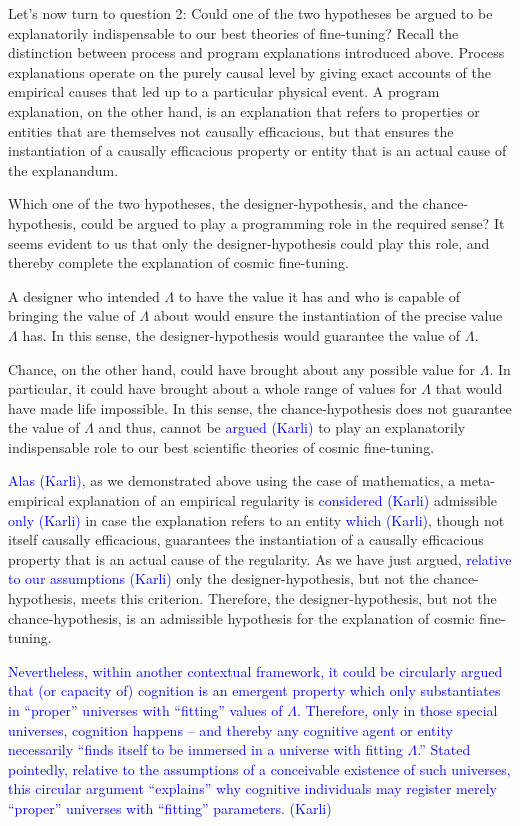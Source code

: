 \documentclass[a4paper,12pt]{article}
\newcommand{\karli}[1]{\textcolor{blue}{#1 (Karli)}}
\begin{document}
Let's now turn to question 2: Could one of the two hypotheses be argued to be explanatorily indispensable to our best theories of fine-tuning? Recall the distinction between process and program explanations introduced above. Process explanations operate on the purely causal level by giving exact accounts of the empirical causes that led up to a particular physical event. A program explanation, on the other hand, is an explanation that refers to properties or entities that are themselves not causally efficacious, but that ensures the instantiation of a causally efficacious property or entity that is an actual cause of the explanandum.

Which one of the two hypotheses, the designer-hypothesis, and the chance-hypothesis, could be argued to play a programming role in the required sense? It seems evident to us that only the designer-hypothesis could play this role, and thereby complete the explanation of cosmic fine-tuning.

A designer who intended $\Lambda$ to have the value it has and who is capable of bringing the value of $\Lambda$ about would ensure the instantiation of the precise value $\Lambda$ has. In this sense, the designer-hypothesis would guarantee the value of $\Lambda$.

Chance, on the other hand, could have brought about any possible value for $\Lambda$.
In particular, it could have brought about a whole range of values for $\Lambda$ that would have made life impossible.
In this sense, the chance-hypothesis does not guarantee the value of $\Lambda$ and thus, cannot be \karli{argued}
to play an explanatorily indispensable role to our best scientific theories of cosmic fine-tuning.

\karli{Alas}, as we demonstrated above using the case of mathematics,
a meta-empirical explanation of an empirical regularity is \karli{considered}
admissible \karli{only}
in case the explanation refers to an entity \karli{which},
though not itself causally efficacious, guarantees the instantiation of a causally efficacious property
that is an actual cause of the regularity.
As we have just argued, \karli{relative to our assumptions}
only the designer-hypothesis, but not the chance-hypothesis, meets this criterion.
Therefore, the designer-hypothesis, but not the chance-hypothesis,
is an admissible hypothesis for the explanation of cosmic fine-tuning.

\karli{
Nevertheless, within another contextual framework,
it could be circularly argued that (or capacity of) cognition is an emergent property
which only substantiates in ``proper'' universes with ``fitting'' values of $\Lambda$.
Therefore, only in those special universes, cognition happens --
and thereby any cognitive agent or entity necessarily ``finds itself to be  immersed
in a universe with fitting $\Lambda$.''
Stated pointedly, relative to the assumptions of a conceivable existence of such universes,
this circular argument ``explains'' why cognitive individuals may register merely ``proper'' universes with ``fitting'' parameters.
}


\newpage

\footnotesize
\singlespacing

\end{document}
